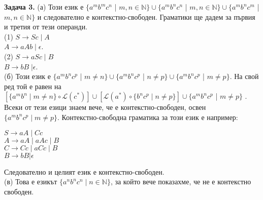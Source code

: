 \documentclass[openany]{book}
\begin{document}
    \textbf{Задача 3.} (а) Този език е $\{a^mb^mc^n$ | $m,n \in \mathbb{N}\} \cup \{a^mb^nc^n$ | $m,n \in \mathbb{N}\} \cup \{a^mb^nc^m$ | $m,n \in \mathbb{N}\}$
    и следователно е контекстно-свободен. Граматики ще дадем за първия и третия от тези операнди. \\
    (1) $S \rightarrow Sc \; | \; A$ \\
    \hspace{15pt}$A \rightarrow aAb \; | \; \epsilon$. \\
    (2) $S \rightarrow aSc \; | \; B$ \\
    \hspace{15pt}$B \rightarrow bB \; | \epsilon$. \\
    \vspace{5pt}
    (б) Този език е $\{a^mb^nc^p$ | $m \neq n\} \cup \{a^mb^nc^p$ | $n \neq p\} \cup \{a^mb^nc^p$ | $m \neq p\}$.
    На свой ред той е равен на $[\{a^mb^n \; | \; m \neq n\} \circ \mathscr{L}(c^*)] \cup [\mathscr{L}(a^*) \circ \{b^nc^p \; | \; n \neq p\}] \cup \{a^mb^nc^p$ | $m \neq p\}$ 
    . Всеки от тези езици знаем вече, че е контекстно-свободен, освен $\{a^mb^nc^p \; | \; m \neq p\}$. 
    Контекстно-свободна граматика за този език е например: \\
    \begin{center}
    $S \rightarrow aA \; | \; Cc$ \\
    $A \rightarrow aA \; | \; aAc \; | \; B$ \\
    $C \rightarrow Cc \; | \; aCc \; | \; B$ \\
    $B \rightarrow bB | \epsilon$ \\
    \end{center}
    Следователно и целият език е контекстно-свободен. \\ 
    \vspace{5pt}
    (в) Това е езикът $\{a^nb^nc^n \; | \; n \in \mathbb{N}\}$, за който вече показахме,
    че не е контекстно свободен. \\
\end{document}
